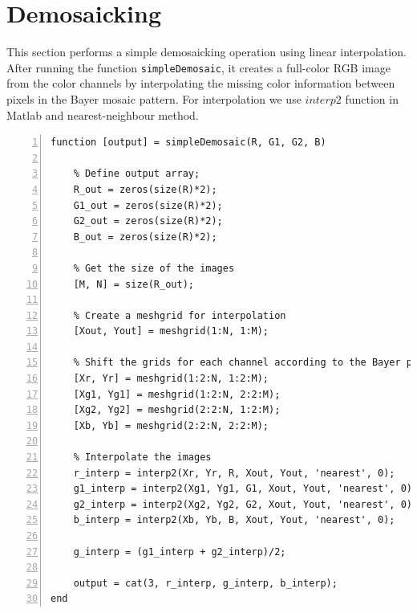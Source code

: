 \documentclass[12pt,a4paper,english
]{tunithesis}
\begin{document}
\section{Demosaicking}
This section performs a simple demosaicking operation using linear interpolation. After running the function \texttt{simpleDemosaic}, it creates a full-color RGB image from the color channels by interpolating the missing color information between pixels in the Bayer mosaic pattern. For interpolation we use $interp2$ function in Matlab and nearest-neighbour method.

\begin{lstlisting}[style=Matlab-editor, numbers=left, basicstyle=\small]
function [output] = simpleDemosaic(R, G1, G2, B)

    % Define output array;
    R_out = zeros(size(R)*2);
    G1_out = zeros(size(R)*2);
    G2_out = zeros(size(R)*2);
    B_out = zeros(size(R)*2);

    % Get the size of the images
    [M, N] = size(R_out);

    % Create a meshgrid for interpolation
    [Xout, Yout] = meshgrid(1:N, 1:M);

    % Shift the grids for each channel according to the Bayer pattern
    [Xr, Yr] = meshgrid(1:2:N, 1:2:M);
    [Xg1, Yg1] = meshgrid(1:2:N, 2:2:M);
    [Xg2, Yg2] = meshgrid(2:2:N, 1:2:M);
    [Xb, Yb] = meshgrid(2:2:N, 2:2:M);

    % Interpolate the images
    r_interp = interp2(Xr, Yr, R, Xout, Yout, 'nearest', 0);
    g1_interp = interp2(Xg1, Yg1, G1, Xout, Yout, 'nearest', 0);
    g2_interp = interp2(Xg2, Yg2, G2, Xout, Yout, 'nearest', 0);
    b_interp = interp2(Xb, Yb, B, Xout, Yout, 'nearest', 0);

    g_interp = (g1_interp + g2_interp)/2;

    output = cat(3, r_interp, g_interp, b_interp);
end
\end{lstlisting}
\end{document}
